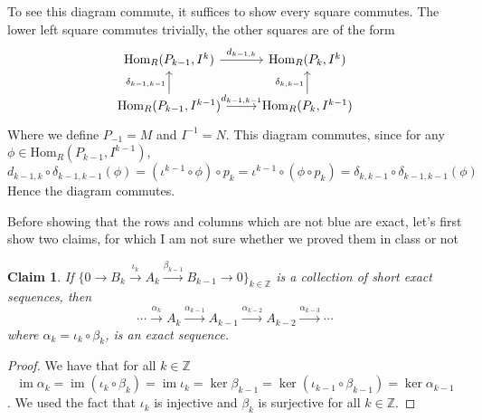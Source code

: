 \documentclass{article}
\newcommand{\Hom}[2]{\mathrm{Hom}_R(#1, #2)}
\DeclareMathOperator{\im}{im}
\newcommand{\Z}{\mathbb{Z}}
\newtheorem{claim}{Claim}
\begin{document}
To see this diagram commute, it suffices to show every square
commutes. The lower left square commutes trivially, the other
squares are of the form
\begin{equation*}
\begin{tikzcd}
\Hom{P_{k-1}}{I^k} \arrow[r, "{d_{k-1, k}}"]
& \Hom{P_k}{I^k}                                    \\
\Hom{P_{k-1}}{I^{k-1}} \arrow[u, "{\delta_{k-1, k-1}}"] \arrow[r, "{d_{k-1,
k-1}}"] & \Hom{P_k}{I^{k-1}} \arrow[u, "{\delta_{k, k-1}}"]
\end{tikzcd}
\end{equation*}
Where we define $P_{-1} = M$ and $I^{-1} = N$.
This diagram commutes, since for any
$\phi \in \Hom{P_{k-1}}{I^{k-1}}$, 
$$d_{k-1, k} \circ \delta_{k-1, k-1}(\phi) =
(\iota^{k-1} \circ \phi) \circ p_k
= \iota^{k-1} \circ (\phi \circ p_k)
= \delta_{k, k-1} \circ \delta_{k-1, k-1}(\phi)
$$
Hence the diagram commutes.

Before showing that the rows and columns which are not blue
are exact, let's
first show two claims, for which I am not sure whether we proved
them in class or not
\begin{claim}
	If $\{0 \to B_k \xrightarrow{\iota_k} A_k
	\xrightarrow{\beta_{k-1}} B_{k-1} \to 0\}_{k \in \Z}$
	is a collection of short exact sequences, then
	$$\cdots \xrightarrow{\alpha_k} A_k \xrightarrow{\alpha_{k-1}}
	A_{k-1} \xrightarrow{\alpha_{k-2}}
	A_{k-2} \xrightarrow{\alpha_{k-3}} \cdots $$
	where $\alpha_k = \iota_k \circ \beta_k$, is an exact sequence.
\end{claim}
\begin{proof}
	We have that for all $k \in \Z$
	$$\im \alpha_k = \im(\iota_k \circ \beta_k) = \im \iota_k
	= \ker \beta_{k-1} = \ker(\iota_{k-1} \circ \beta_{k-1})
	= \ker \alpha_{k-1}$$.
	We used the fact that $\iota_k$ is injective 
	and $\beta_k$ is surjective for all $k \in \Z$.
\end{proof}
\end{document}
